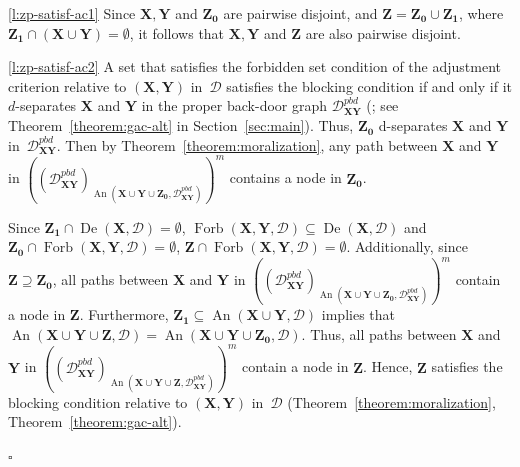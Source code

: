\documentclass[11pt,a4paper]{article}
\newcommand{\bY}{\mathbf{Y}}
\newenvironment{proofof}[1][]{\begin{trivlist}
   \item[\hskip \labelsep {\bfseries Proof of #1.}]}{\hfill{}$\square$\end{trivlist}}
\DeclareMathOperator{\De}{De}
\DeclareMathOperator{\An}{An}
\DeclareMathOperator{\Forbi}{Forb}
\newcommand{\forb}{the forbidden set condition\xspace}
\newcommand{\blck}{the blocking condition\xspace}
\newcommand{\g}[1][G]{\mathcal{#1}}
\newcommand{\gpbd}[2][G]{\mathcal{#1}_{\mathbf{#2}}^{pbd}}
\newcommand{\fb}[2][X,Y]{\Forbi(\mathbf{#1},#2)}%
\begin{document}
\begin{proofof}[Lemma~\ref{lemma:zprime satisfies ac}]

\ref{l:zp-satisf-ac1} Since $\mathbf{X,Y}$ and $\mathbf{Z_0}$ are pairwise disjoint, and $\mathbf{Z} = \mathbf{Z_0} \cup \mathbf{Z_1}$, where $\mathbf{Z_1} \cap (\mathbf{X} \cup \mathbf{Y}) = \emptyset$, it follows that $\mathbf{X,Y}$ and $\mathbf{Z}$ are also pairwise disjoint.

\ref{l:zp-satisf-ac2} A set that satisfies \forb{} of the adjustment criterion relative to $(\mathbf{X,Y})$ in~$\g[D]$ satisfies \blck{} if and only if it
$d$-separates $\mathbf{X}$ and $\mathbf{Y}$ in the proper back-door graph $\gpbd[D]{XY}$ (\citet[Theorem~4.6]{vanconstructing}; see Theorem~\ref{theorem:gac-alt} in Section~\ref{sec:main}).
Thus, $\mathbf{Z_0}$ d-separates $\mathbf{X}$ and $\mathbf{Y}$ in~$\gpbd[D]{XY}$. Then by Theorem~\ref{theorem:moralization},  
 any path between $\mathbf{X}$ and $\mathbf{Y}$
in $((\gpbd[D]{XY})_{\An(\mathbf{X} \cup \bY \cup \mathbf{Z_0},\gpbd[D]{XY})})^m$ contains a node in $\mathbf{Z_0}$.

Since $\mathbf{Z_1} \cap \De(\mathbf{X},\g[D]) = \emptyset$, $\fb{\g[D]} \subseteq \De(\mathbf{X},\g[D])$ and $\mathbf{Z_0} \cap \fb{\g[D]} = \emptyset$, $\mathbf{Z} \cap \fb{\g[D]} = \emptyset$.
Additionally, since  $\mathbf{Z} \supseteq \mathbf{Z_0}$, all paths between $\mathbf{X}$ and $\mathbf{Y}$
in $((\gpbd[D]{XY})_{\An(\mathbf{X} \cup \bY \cup \mathbf{Z_0},\gpbd[D]{XY})})^m$ contain a node in $\mathbf{Z}$.
Furthermore, $\mathbf{Z_1} \subseteq \An(\mathbf{X} \cup \mathbf{Y},\g[D])$ implies that $\An(\mathbf{X} \cup \bY \cup \mathbf{Z},\g[D]) = \An(\mathbf{X} \cup \bY \cup \mathbf{Z_0},\g[D])$. Thus, all paths between $\mathbf{X}$ and $\mathbf{Y}$ in $((\gpbd[D]{XY})_{\An(\mathbf{X} \cup \bY \cup \mathbf{Z},\gpbd[D]{XY})})^m$ contain a node in $\mathbf{Z}$. Hence, $\mathbf{Z}$ satisfies \blck{} relative to $(\mathbf{X,Y})$ in~$\g[D]$ (Theorem~\ref{theorem:moralization}, Theorem~\ref{theorem:gac-alt}).


\end{proofof}
\end{document}
